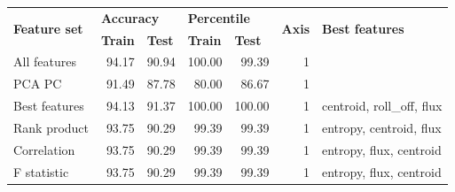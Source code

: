 \begin{table}[h]
\begin{adjustbox}{width=\textwidth}
\begin{tabular}{|l|rr|rr|r|l|}
\hline
\multirow{2}{*}{\textbf{Feature set}} & \multicolumn{2}{l|}{\textbf{Accuracy}}                                   & \multicolumn{2}{l|}{\textbf{Percentile}}                 & \multicolumn{1}{l|}{\multirow{2}{*}{\textbf{Axis}}} & \multirow{2}{*}{\textbf{Best features}} \\ \cline{2-5}
                                      & \multicolumn{1}{l|}{\textbf{Train}} & \multicolumn{1}{l|}{\textbf{Test}} & \multicolumn{1}{l|}{\textbf{Train}} & \multicolumn{1}{l|}{\textbf{Test}} & \multicolumn{1}{l|}{}                               &                                         \\ \hline
All features                          & \multicolumn{1}{r|}{94.17}          & 90.94                              & \multicolumn{1}{r|}{100.00}         & 99.39                              & 1                                                   &                                         \\ \hline
PCA PC                                & \multicolumn{1}{r|}{91.49}          & 87.78                              & \multicolumn{1}{r|}{80.00}          & 86.67                              & 1                                                   &                                         \\ \hline
Best features                         & \multicolumn{1}{r|}{94.13}          & 91.37                              & \multicolumn{1}{r|}{100.00}         & 100.00                             & 1                                                   & centroid, roll\_off, flux               \\ \hline
Rank product                          & \multicolumn{1}{r|}{93.75}          & 90.29                              & \multicolumn{1}{r|}{99.39}          & 99.39                              & 1                                                   & entropy, centroid, flux                 \\ \hline
Correlation                           & \multicolumn{1}{r|}{93.75}          & 90.29                              & \multicolumn{1}{r|}{99.39}          & 99.39                              & 1                                                   & entropy, flux, centroid                 \\ \hline
F statistic                           & \multicolumn{1}{r|}{93.75}          & 90.29                              & \multicolumn{1}{r|}{99.39}          & 99.39                              & 1                                                   & entropy, flux, centroid                 \\ \hline

\end{tabular}
\end{adjustbox}
\end{table}
